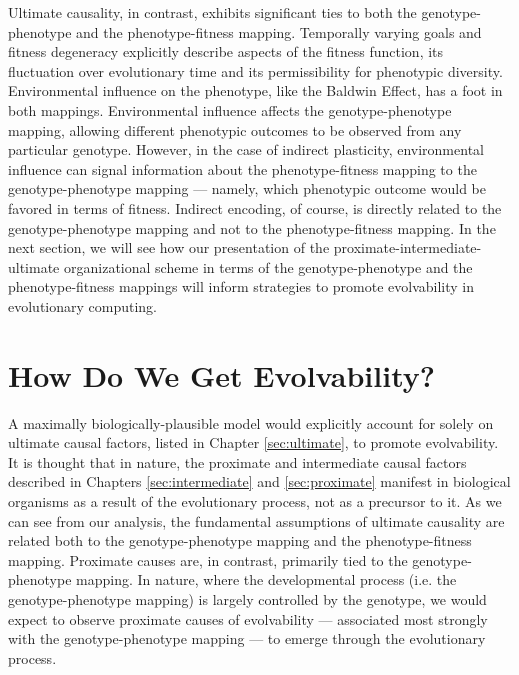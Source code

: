 Ultimate causality, in contrast, exhibits significant ties to both the genotype-phenotype and the phenotype-fitness mapping.
Temporally varying goals and fitness degeneracy explicitly describe aspects of the fitness function, its fluctuation over evolutionary time and its permissibility for phenotypic diversity. Environmental influence on the phenotype, like the Baldwin Effect, has a foot in both mappings.
Environmental influence affects the genotype-phenotype mapping, allowing different phenotypic outcomes to be observed from any particular genotype. 
However, in the case of indirect plasticity, environmental influence can signal information about the phenotype-fitness mapping to the genotype-phenotype mapping --- namely, which phenotypic outcome would be favored in terms of fitness.
Indirect encoding, of course, is directly related to the genotype-phenotype mapping and not to the phenotype-fitness mapping.
In the next section, we will see how our presentation of the proximate-intermediate-ultimate organizational scheme in terms of the genotype-phenotype and the phenotype-fitness mappings will inform strategies to promote evolvability in evolutionary computing.

\section{How Do We Get Evolvability?} \label{sec:how_get}

A maximally biologically-plausible model would explicitly account for solely on ultimate causal factors, listed in Chapter \ref{sec:ultimate}, to promote evolvability.
It is thought that in nature, the proximate and intermediate causal factors described in Chapters \ref{sec:intermediate} and \ref{sec:proximate} manifest in biological organisms as a result of the evolutionary process, not as a precursor to it. 
As we can see from our analysis, the fundamental assumptions of ultimate causality are related both to the genotype-phenotype mapping and the phenotype-fitness mapping. 
Proximate causes are, in contrast, primarily tied to the genotype-phenotype mapping.
In nature, where the developmental process (i.e. the genotype-phenotype mapping) is largely controlled by the genotype, we would expect to observe proximate causes of evolvability --- associated most strongly with the genotype-phenotype mapping --- to emerge through the evolutionary process. 

